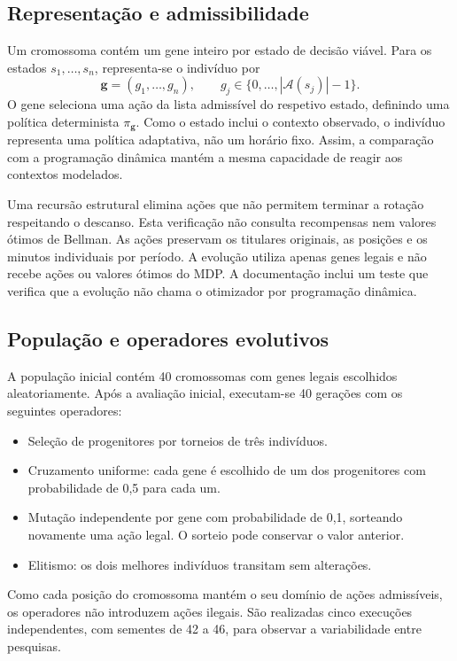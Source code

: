\subsection{Representação e admissibilidade}

Um cromossoma contém um gene inteiro por estado de decisão viável.
Para os estados \(s_1,\ldots,s_n\), representa-se o indivíduo por
\[
\boldsymbol{g}=(g_1,\ldots,g_n),\qquad
 g_j\in\{0,\ldots,|\mathcal{A}(s_j)|-1\}.
\]
O gene seleciona uma ação da lista admissível do respetivo estado,
definindo uma política determinista \(\pi_{\boldsymbol{g}}\). Como o estado
inclui o contexto observado, o indivíduo representa uma política adaptativa,
não um horário fixo. Assim, a comparação com a programação dinâmica
mantém a mesma capacidade de reagir aos contextos modelados.

Uma recursão estrutural elimina ações que não permitem terminar a rotação
respeitando o descanso. Esta verificação não consulta recompensas nem
valores ótimos de Bellman. As ações preservam os titulares originais,
as posições e os minutos individuais por período. A evolução utiliza
apenas genes legais e não recebe ações ou valores ótimos do MDP.
A documentação inclui um teste que verifica que a evolução não chama
o otimizador por programação dinâmica.

\subsection{População e operadores evolutivos}

A população inicial contém 40 cromossomas com genes legais escolhidos
aleatoriamente. Após a avaliação inicial, executam-se 40 gerações com
os seguintes operadores:
\begin{itemize}
\item Seleção de progenitores por torneios de três indivíduos.
\item Cruzamento uniforme: cada gene é escolhido de um dos progenitores
 com probabilidade de 0,5 para cada um.
\item Mutação independente por gene com probabilidade de 0,1, sorteando
 novamente uma ação legal. O sorteio pode conservar o valor anterior.
\item Elitismo: os dois melhores indivíduos transitam sem alterações.
\end{itemize}
Como cada posição do cromossoma mantém o seu domínio de ações admissíveis,
os operadores não introduzem ações ilegais. São realizadas cinco execuções
independentes, com sementes de 42 a 46, para observar a variabilidade
entre pesquisas.

